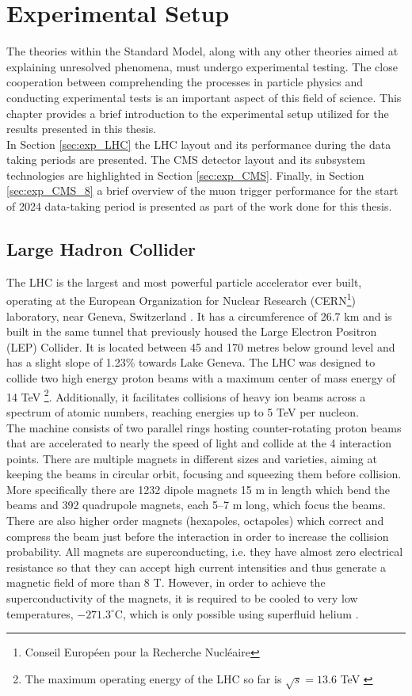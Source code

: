 \cleardoublepage%
\chapter{\label{chap:Experiment}Experimental Setup}%
\noindent The theories within the Standard Model, along with any other theories aimed at explaining unresolved phenomena, must undergo experimental testing. The close cooperation between comprehending the processes in particle physics and conducting experimental tests is an important aspect of this field of science. This chapter provides a brief introduction to the experimental setup utilized for the results presented in this thesis.\\
\indent In Section \ref{sec:exp_LHC} the LHC layout and its performance during the data taking periods are presented. The CMS detector layout and its subsystem technologies are highlighted in Section \ref{sec:exp_CMS}. Finally, in Section \ref{sec:exp_CMS_8} a brief overview of the muon trigger performance for the start of 2024 data-taking period is presented as part of the work done for this thesis. 

\section{\label{sec:exp_LHC}Large Hadron Collider}
\noindent The LHC is the largest and most powerful particle accelerator ever built, operating at the European Organization for Nuclear Research (CERN\footnote{Conseil Européen pour la Recherche Nucléaire}) laboratory, near Geneva, Switzerland \cite{Brüning:782076, Lyndon_Evans_2008}. It has a circumference of 26.7 km and is built in the same tunnel that previously housed the Large Electron Positron (LEP) Collider. It is located between 45 and 170 metres below ground level and has a slight slope of 1.23\% towards Lake Geneva. The LHC was designed to collide two high energy proton beams with a maximum center of mass energy of 14 TeV \footnote{The maximum operating energy of the LHC so far is $\sqrt{s} = 13.6$ TeV \cite{cern}}. Additionally, it facilitates collisions of heavy ion beams across a spectrum of atomic numbers, reaching energies up to 5 TeV per nucleon.\\
\indent The machine consists of two parallel rings hosting counter-rotating proton beams that are accelerated to nearly the speed of light and collide at the 4 interaction points. There are multiple magnets in different sizes and varieties, aiming at keeping the beams in circular orbit, focusing and squeezing them before collision. More specifically there are 1232 dipole magnets 15 m in length which bend the beams and 392 quadrupole magnets, each 5–7 m long, which focus the beams.  There are also higher order magnets (hexapoles, octapoles) which correct and compress the beam just before the interaction in order to increase the collision probability. All magnets are superconducting, i.e. they have almost zero electrical resistance so that they can accept high current intensities and thus generate a magnetic field of more than 8 T. However, in order to achieve the superconductivity of the magnets, it is  required to be cooled to very low temperatures, $-271.3^{\circ}$C, which is only possible using superfluid helium \cite{CERN_cooling}.

